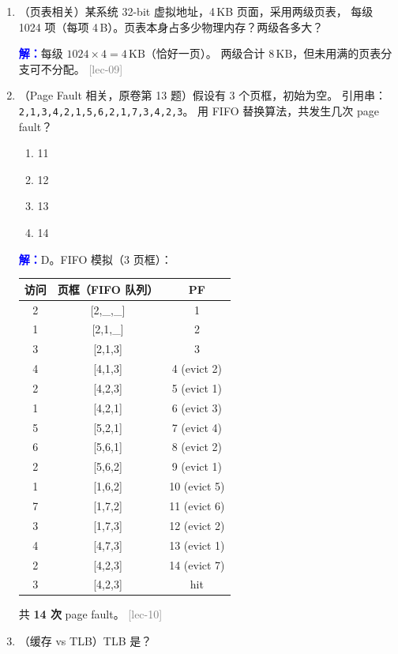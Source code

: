 \documentclass[11pt,a4paper]{article}
\newcommand{\ans}{\par\noindent\textcolor{blue}{\textbf{解：}}}
\newcommand{\lec}[1]{\textcolor{gray}{[lec-#1]}}
\begin{document}
\begin{enumerate}[leftmargin=*,itemsep=8pt]
\item （页表相关）某系统 32-bit 虚拟地址，4\,KB 页面，采用两级页表，
  每级 1024 项（每项 4\,B）。页表本身占多少物理内存？两级各多大？

  \ans 每级 $1024 \times 4 = 4\,\text{KB}$（恰好一页）。
  两级合计 8\,KB，但未用满的页表分支可不分配。 \lec{09}

\item （Page Fault 相关，原卷第 13 题）假设有 3 个页框，初始为空。
  引用串：\texttt{2,1,3,4,2,1,5,6,2,1,7,3,4,2,3}。
  用 FIFO 替换算法，共发生几次 page fault？

  \begin{enumerate}[label=\Alph*.]
    \item 11
    \item 12
    \item 13
    \item 14
  \end{enumerate}

  \ans D。FIFO 模拟（3 页框）：

  \begin{tabular}{c|c|c}
  访问 & 页框（FIFO 队列） & PF \\
  \midrule
  2 & [2,\_,\_]   & 1 \\
  1 & [2,1,\_]    & 2 \\
  3 & [2,1,3]     & 3 \\
  4 & [4,1,3]     & 4 (evict 2) \\
  2 & [4,2,3]     & 5 (evict 1) \\
  1 & [4,2,1]     & 6 (evict 3) \\
  5 & [5,2,1]     & 7 (evict 4) \\
  6 & [5,6,1]     & 8 (evict 2) \\
  2 & [5,6,2]     & 9 (evict 1) \\
  1 & [1,6,2]     & 10 (evict 5) \\
  7 & [1,7,2]     & 11 (evict 6) \\
  3 & [1,7,3]     & 12 (evict 2) \\
  4 & [4,7,3]     & 13 (evict 1) \\
  2 & [4,2,3]     & 14 (evict 7) \\
  3 & [4,2,3]     & hit \\
  \end{tabular}

  共 \textbf{14 次} page fault。 \lec{10}

\item （缓存 vs TLB）TLB 是？


\end{enumerate}
\end{document}
